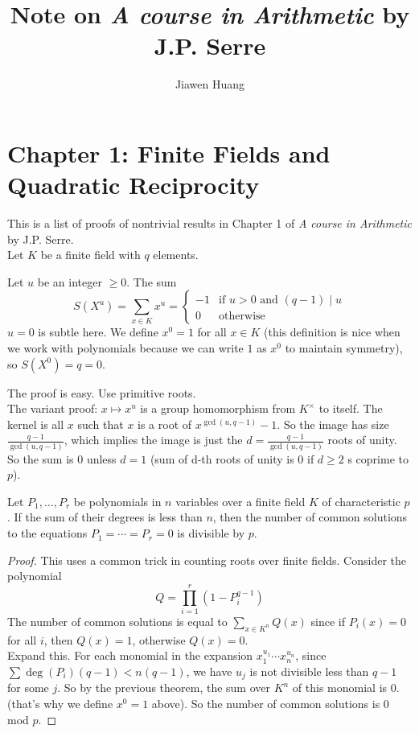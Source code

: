 \documentclass[15pt]{scrartcl}
\begin{document}
\title{Note on \textit{A course in Arithmetic} by J.P. Serre}
\author{Jiawen Huang}
\maketitle
\newpage
\tableofcontents
\newpage

\section{Chapter 1: Finite Fields and Quadratic Reciprocity}
This is a list of proofs of nontrivial results in Chapter 1 of \textit{A course in Arithmetic} by J.P. Serre.
\\

Let $K$ be a finite field with $q$ elements. 
\begin{theorem}
    Let $u$ be an integer $\geq 0$. The sum 
    \[S(X^u)=\sum_{x\in K} x^u=\begin{cases}
        -1 & \text{if } u>0 \text{ and } (q-1)\mid u\\
        0 & \text{otherwise}
    \end{cases}\]
$u=0$ is subtle here. We define $x^0=1$ for all $x\in K$ (this definition is nice when we work with polynomials because we can write $1$ as $x^0$ to maintain symmetry), so $S(X^0)=q=0$.
\end{theorem}
The proof is easy. Use primitive roots. 
\\
The variant proof: $x\mapsto x^u$ is a group homomorphism from $K^\times $ to itself. The kernel is all $x$ such that $x$ is a root of $x^{\gcd(u,q-1)}-1$. So the image has size $\frac{q-1}{\gcd(u,q-1)}$, which implies the image is just the $d=\frac{q-1}{\gcd(u,q-1)}$ roots of unity. So the sum is $0$ unless $d=1$ (sum of d-th roots of unity is $0$ if $d\geq 2$ s coprime to $p$).
\begin{theorem}
    Let $P_1,\ldots,P_r$ be polynomials in $n$ variables over a finite field $K$ of characteristic $p$. If the sum of their degrees is less than $n$, then the number of common solutions to the equations $P_1=\cdots=P_r=0$ is divisible by $p$. 
\end{theorem}
\begin{proof}
This uses a common trick in counting roots over finite fields. Consider the polynomial
\[Q=\prod_{i=1}^r (1-P_i^{q-1})\]
The number of common solutions is equal to $\sum_{x\in K^n} Q(x)$ since if $P_i(x)=0$ for all $i$, then $Q(x)=1$, otherwise $Q(x)=0$. 
\\

Expand this. For each monomial in the expansion $x^{u_1}_1\cdots x^{u_n}_n$, since $\sum \deg(P_i)(q-1)<n(q-1)$, we have $u_j$ is not divisible less than $q-1$ for some $j$. So by the previous theorem, the sum over $K^n$ of this monomial is $0$. (that's why we define $x^0=1$ above). So the number of common solutions is $0$ mod $p$.
\end{proof}
\end{document}
